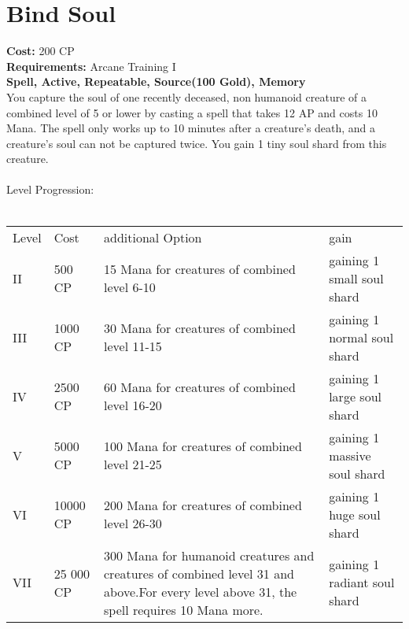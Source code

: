 \section{Bind Soul}
\textbf{Cost:} 200 CP\\
\textbf{Requirements:}  Arcane Training I\\
\textbf{Spell, Active, Repeatable, Source(100 Gold), Memory}\\
You capture the soul of one recently deceased, non humanoid creature of a combined level of 5 or lower by casting a spell that takes 12 AP and costs 10 Mana. The spell only works up to 10 minutes after a creature’s death, and a creature’s soul can not be captured twice. You gain 1 tiny soul shard from this creature.\\
\\
Level Progression:\\
\\
\begin{tabular}{l | l | p{5.5cm} | p{2.5cm}}
    Level & Cost & additional Option & gain\\
    II & 500 CP & 15 Mana for creatures of combined level 6-10 & gaining 1 small soul shard\\
    III & 1000 CP & 30 Mana for creatures of combined level 11-15 & gaining 1 normal soul shard\\
    IV & 2500 CP & 60 Mana for creatures of combined level 16-20 & gaining 1 large soul shard\\
    V & 5000 CP & 100 Mana for creatures of combined level 21-25 & gaining 1 massive soul shard\\
    VI & 10000 CP & 200 Mana for creatures of combined level 26-30 & gaining 1 huge soul shard\\
    VII & 25 000 CP & 300 Mana for humanoid creatures and creatures of combined level 31 and above.\linebreak For every level above 31, the spell requires 10 Mana more. & gaining 1 radiant soul shard\\
\end{tabular}